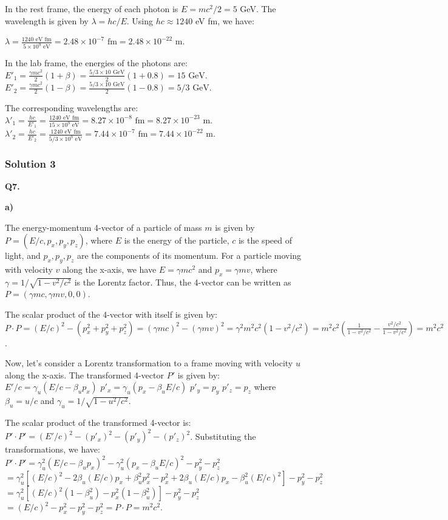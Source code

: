 \documentclass{article}
\begin{document}
In the rest frame, the energy of each photon is $E = mc^2/2 = 5$ GeV. The wavelength is given by $\lambda = hc/E$. Using $hc \approx 1240$ eV fm, we have:

$\lambda = \frac{1240 \text{ eV fm}}{5 \times 10^9 \text{ eV}} = 2.48 \times 10^{-7} \text{ fm} = 2.48 \times 10^{-22} \text{ m}$.

In the lab frame, the energies of the photons are:
$E'_1 = \frac{\gamma mc^2}{2}(1+\beta) = \frac{5/3 \times 10 \text{ GeV}}{2} (1+0.8) = 15 \text{ GeV}$.
$E'_2 = \frac{\gamma mc^2}{2}(1-\beta) = \frac{5/3 \times 10 \text{ GeV}}{2} (1-0.8) = 5/3 \text{ GeV}$.

The corresponding wavelengths are:
$\lambda'_1 = \frac{hc}{E'_1} = \frac{1240 \text{ eV fm}}{15 \times 10^9 \text{ eV}} = 8.27 \times 10^{-8} \text{ fm} = 8.27 \times 10^{-23} \text{ m}$.
$\lambda'_2 = \frac{hc}{E'_2} = \frac{1240 \text{ eV fm}}{5/3 \times 10^9 \text{ eV}} = 7.44 \times 10^{-7} \text{ fm} = 7.44 \times 10^{-22} \text{ m}$.


\subsubsection{Solution 3}
\textbf{Q7.}

\textbf{a)}

The energy-momentum 4-vector of a particle of mass $m$ is given by $P = (E/c, p_x, p_y, p_z)$, where $E$ is the energy of the particle, $c$ is the speed of light, and $p_x, p_y, p_z$ are the components of its momentum. For a particle moving with velocity $v$ along the x-axis, we have $E = \gamma mc^2$ and $p_x = \gamma mv$, where $\gamma = 1/\sqrt{1 - v^2/c^2}$ is the Lorentz factor. Thus, the 4-vector can be written as $P = (\gamma mc, \gamma mv, 0, 0)$.

The scalar product of the 4-vector with itself is given by:
$P \cdot P = (E/c)^2 - (p_x^2 + p_y^2 + p_z^2) = (\gamma mc)^2 - (\gamma mv)^2 = \gamma^2 m^2 c^2 (1 - v^2/c^2) = m^2 c^2 ( \frac{1}{1 - v^2/c^2} - \frac{v^2/c^2}{1 - v^2/c^2}) = m^2 c^2$.

Now, let's consider a Lorentz transformation to a frame moving with velocity $u$ along the x-axis. The transformed 4-vector $P'$ is given by:
$E'/c = \gamma_u (E/c - \beta_u p_x)$
$p'_x = \gamma_u (p_x - \beta_u E/c)$
$p'_y = p_y$
$p'_z = p_z$
where $\beta_u = u/c$ and $\gamma_u = 1/\sqrt{1 - u^2/c^2}$.

The scalar product of the transformed 4-vector is:
$P' \cdot P' = (E'/c)^2 - (p'_x)^2 - (p'_y)^2 - (p'_z)^2$.
Substituting the transformations, we have:
$P' \cdot P' = \gamma_u^2 (E/c - \beta_u p_x)^2 - \gamma_u^2 (p_x - \beta_u E/c)^2 - p_y^2 - p_z^2$
$= \gamma_u^2 [(E/c)^2 - 2\beta_u (E/c)p_x + \beta_u^2 p_x^2 - p_x^2 + 2\beta_u (E/c)p_x - \beta_u^2 (E/c)^2] - p_y^2 - p_z^2$
$= \gamma_u^2 [(E/c)^2 (1 - \beta_u^2) - p_x^2 (1 - \beta_u^2)] - p_y^2 - p_z^2$
$= (E/c)^2 - p_x^2 - p_y^2 - p_z^2 = P \cdot P = m^2 c^2$.
\end{document}
